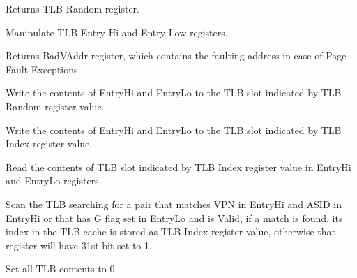 
Returns TLB Random register.


Manipulate TLB Entry Hi and Entry Low registers.


Returns BadVAddr register, which contains the faulting address in case of Page Fault Exceptions.


Write the contents of EntryHi and EntryLo to the TLB slot indicated by TLB Random register value.


Write the contents of EntryHi and EntryLo to the TLB slot indicated by TLB Index register value.


Read the contents of TLB slot indicated by TLB Index register value in EntryHi and EntryLo registers.


Scan the TLB searching for a pair that matches VPN in EntryHi and ASID in EntryHi or that has G flag set in EntryLo and is Valid, if a match is found, its index in the TLB cache is stored as TLB Index register value, otherwise that register will have 31st bit set to 1.


Set all TLB contents to 0.
